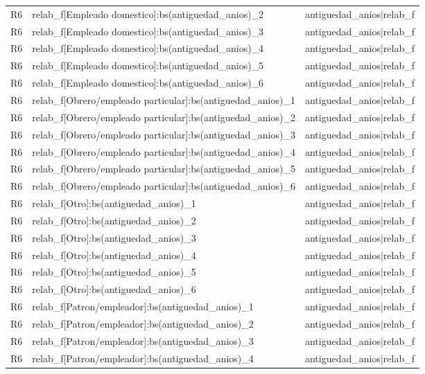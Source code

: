 \begin{longtable}{lll}
R6 & relab\_f[Empleado domestico]:bs(antiguedad\_anios)\_2 & antiguedad\_anios|relab\_f \\
R6 & relab\_f[Empleado domestico]:bs(antiguedad\_anios)\_3 & antiguedad\_anios|relab\_f \\
R6 & relab\_f[Empleado domestico]:bs(antiguedad\_anios)\_4 & antiguedad\_anios|relab\_f \\
R6 & relab\_f[Empleado domestico]:bs(antiguedad\_anios)\_5 & antiguedad\_anios|relab\_f \\
R6 & relab\_f[Empleado domestico]:bs(antiguedad\_anios)\_6 & antiguedad\_anios|relab\_f \\
R6 & relab\_f[Obrero/empleado particular]:bs(antiguedad\_anios)\_1 & antiguedad\_anios|relab\_f \\
R6 & relab\_f[Obrero/empleado particular]:bs(antiguedad\_anios)\_2 & antiguedad\_anios|relab\_f \\
R6 & relab\_f[Obrero/empleado particular]:bs(antiguedad\_anios)\_3 & antiguedad\_anios|relab\_f \\
R6 & relab\_f[Obrero/empleado particular]:bs(antiguedad\_anios)\_4 & antiguedad\_anios|relab\_f \\
R6 & relab\_f[Obrero/empleado particular]:bs(antiguedad\_anios)\_5 & antiguedad\_anios|relab\_f \\
R6 & relab\_f[Obrero/empleado particular]:bs(antiguedad\_anios)\_6 & antiguedad\_anios|relab\_f \\
R6 & relab\_f[Otro]:bs(antiguedad\_anios)\_1 & antiguedad\_anios|relab\_f \\
R6 & relab\_f[Otro]:bs(antiguedad\_anios)\_2 & antiguedad\_anios|relab\_f \\
R6 & relab\_f[Otro]:bs(antiguedad\_anios)\_3 & antiguedad\_anios|relab\_f \\
R6 & relab\_f[Otro]:bs(antiguedad\_anios)\_4 & antiguedad\_anios|relab\_f \\
R6 & relab\_f[Otro]:bs(antiguedad\_anios)\_5 & antiguedad\_anios|relab\_f \\
R6 & relab\_f[Otro]:bs(antiguedad\_anios)\_6 & antiguedad\_anios|relab\_f \\
R6 & relab\_f[Patron/empleador]:bs(antiguedad\_anios)\_1 & antiguedad\_anios|relab\_f \\
R6 & relab\_f[Patron/empleador]:bs(antiguedad\_anios)\_2 & antiguedad\_anios|relab\_f \\
R6 & relab\_f[Patron/empleador]:bs(antiguedad\_anios)\_3 & antiguedad\_anios|relab\_f \\
R6 & relab\_f[Patron/empleador]:bs(antiguedad\_anios)\_4 & antiguedad\_anios|relab\_f \\

\end{longtable}
